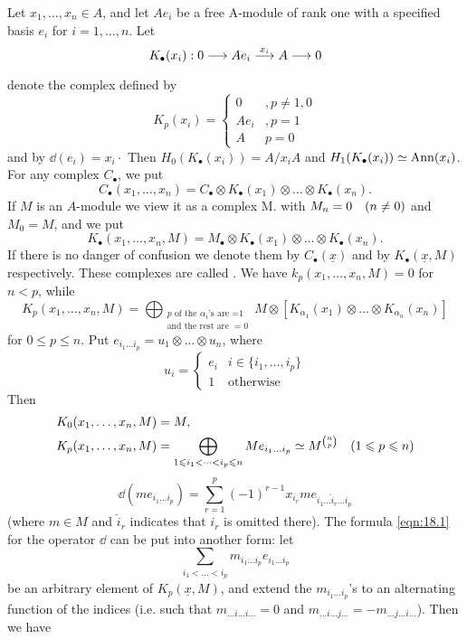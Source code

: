 \documentclass[../main]{subfiles}
\begin{document}
Let $x_{1}, \dots, x_{n} \in A$, and let $A e_{i}$ be a free A-module of rank one with a specified basis $e_{i}$ for $i=1, \dots, n$. Let 
\[K_{\bullet}(x_{i}): 0 \varrightarrow{} A e_{i} \varrightarrow{x_i} A \varrightarrow{} 0\]
denote the complex defined by
\[K_p(x_i) = \begin{cases} 0 &, p\neq 1,0 \\ Ae_i &, p=1\\ A & p=0\end{cases}\]
and by $\dd(e_{i})=x_{i} \cdot$ Then $H_{0}(K_{\bullet}(x_{i}))=A / x_{i} A$ and $H_{1}(K_{\bullet}(x_{i})) \simeq \operatorname{Ann}(x_{i})$. For any complex $C_\bullet$, we put \[C_\bullet(x_{1}, \dots, x_{n})=C_\bullet \otimes K_\bullet(x_{1}) \otimes \dots \otimes K_\bullet(x_{n}).\] 
If $M$ is an $A$-module we view it as a complex M. with $M_{n}=0\for{n \neq 0}$ and $M_{0}=M$, and we put \[K_{\bullet}(x_{1}, \dots, x_{n}, M)=M_\bullet \otimes K_\bullet(x_{1}) \otimes \dots \otimes K_\bullet(x_{n}).\] If there is no danger of confusion we denote them by $C_\bullet(\underline{x})$ and by $K_\bullet (\underline{x}, M)$ respectively. These complexes are called . We have $k_{p}(x_{1}, \dots, x_{n}, M)=0$ for $n<p$, while
\[
K_{p}(x_{1}, \dots, x_{n}, M)= \bigoplus_{\substack{p \text{ of the } \alpha_i\text{'s are =1}\\ \text{and the rest are }=0}} M\otimes [K_{\alpha_1}(x_1)\otimes \dots \otimes K_{\alpha_n} (x_n)]
\]
for $0 \leqslant p \leqslant n$. Put $e_{i_{1} \dots i_{p}}=u_{1} \otimes \dots \otimes u_{n}$, where \[u_i =\begin{cases}e_i & i\in \{i_1,\dots , i_p\}\\ 1&\text{otherwise}\end{cases}\] Then
\[\begin{aligned}
K_{0}(x_{1}, \dots, x_{n}, M)&=M,\\
K_p(x_1,\dots,x_n,M) &= \bigoplus_{1\leq i_1<\dots<i_p\leq n} Me_{i_1\dots i_p} \simeq M^{\binom{n}{p}} \for{1\leq p\leq n}
\end{aligned}\]
\[\tag{18.1}\label{eqn:18.1}\dd(m e_{i_{1}\dots i_{p}})=\sum_{r=1}^{p}(-1)^{r-1} x_{i_{r}}m e_{i_{1} \dots \hat{i}_{r} \dots i_{p}}\]
(where $m \in M$ and $\hat{i}_{r}$ indicates that $i_{r}$ is omitted there).
The formula \ref{eqn:18.1} for the operator $\dd$ can be put into another
form: let \[\sum_{ i_{1}<\dots<i_{p} }m_{i_1 \dots i_{p}} e_{i_{1} \dots i_{p}}\] be an arbitrary
element of $K_{p}(\underline{x}, M)$, and extend the $m_{i_{1} \dots i_{p}}$'s to an alternating function of the indices (i.e. such that $m_{\dots i \dots i\dots }=0$
and $m_{\dots i \dots j \dots}=-m_{\dots j \dots i \dots}$). Then we have
\end{document}
